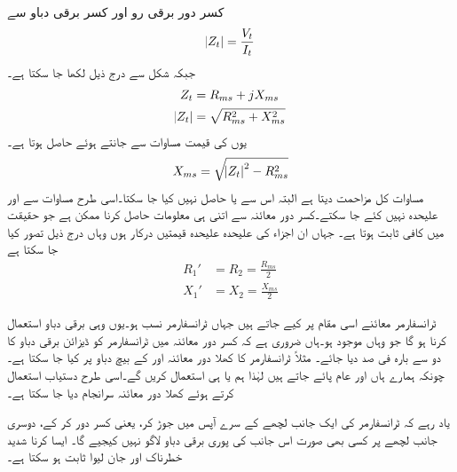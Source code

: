 کسر دور برقی رو اور کسر برقی دباو سے 
\begin{align*}
\abs{Z_t}=\frac{V_t}{I_t}
\end{align*}
جبکہ  شکل  سے  درج ذیل لکھا جا سکتا ہے۔
\begin{align*}
Z_t&=R_{ms}+j X_{ms}\\
\abs{Z_t}&=\sqrt{R_{ms}^2+X_{ms}^2}
\end{align*}
یوں  کی قیمت مساوات  سے  جانتے ہوئے  حاصل ہوتا ہے۔
\begin{align}\label{مساوات_ٹرانسفارمر_کسر_دور_امالہ_حاصل}
X_{ms}=\sqrt{\abs{Z_t}^2-R_{ms}^2}
\end{align}
مساوات  کل مزاحمت دیتا ہے البتہ اس سے  یا  حاصل نہیں کیا جا سکتا۔اسی طرح مساوات  سے  اور  علیحدہ نہیں کئے جا سکتے۔کسر دور معائنہ سے اتنی ہی معلومات حاصل کرنا ممکن ہے جو حقیقت  میں کافی ثابت ہوتا ہے۔ جہاں ان اجزاء کی علیحدہ علیحدہ قیمتیں درکار ہوں وہاں درج ذیل تصور کیا جا سکتا ہے
\begin{align*}
R_1'&=R_2=\frac{R_{ms}}{2}\\
X_1'&=X_2=\frac{X_{ms}}{2}
\end{align*}


ٹرانسفارمر معائنے  اسی مقام پر کیے جاتے ہیں جہاں ٹرانسفارمر نسب ہو۔یوں وہی  برقی دباو استعمال کرنا ہو گا جو وہاں موجود ہو۔ہاں  ضروری ہے کہ  کسر دور معائنہ میں  ٹرانسفارمر کو  ڈیزائن  برقی دباو کا دو سے بارہ  فی صد دیا جائے۔ مثلاً   ٹرانسفارمر کا کھلا دور معائنہ   اور   کے بیچ  دباو پر کیا جا سکتا ہے۔ چونکہ ہمارے ہاں   اور   عام پائے جاتے ہیں لہٰذا ہم   یا   ہی استعمال کریں گے۔اسی طرح دستیاب  استعمال کرتے ہوئے کھلا دور معائنہ سرانجام دیا جا سکتا ہے۔

یاد رہے کہ ٹرانسفارمر کی ایک جانب لچھے کے سرے آپس میں جوڑ کر، یعنی  کسر دور کر کے، دوسری جانب لچھے پر کسی بھی صورت اس جانب کی پوری برقی دباو لاگو نہیں کیجیے گا۔ ایسا کرنا  شدید  خطرناک اور جان لیوا ثابت ہو سکتا ہے۔

